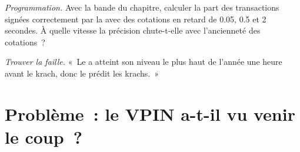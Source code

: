 \begin{exercise}[$\star\star\star$]\label{exo:rs:trade-flow-features:7}
\emph{Programmation.} Avec la bande du chapitre, calculer la part des transactions signées correctement par la  avec des cotations en retard de
0.05, 0.5 et 2 secondes. À quelle vitesse la précision chute-t-elle avec l'ancienneté des cotations~?
\end{exercise}

\begin{exercise}[$\star\star\star$]\label{exo:rs:trade-flow-features:8}
\emph{Trouver la faille.} «~Le  a atteint son niveau le plus haut de l'année une heure avant le krach, donc le  prédit les krachs.~»
\end{exercise}

\section{Problème~: le VPIN a-t-il vu venir le coup~?}

